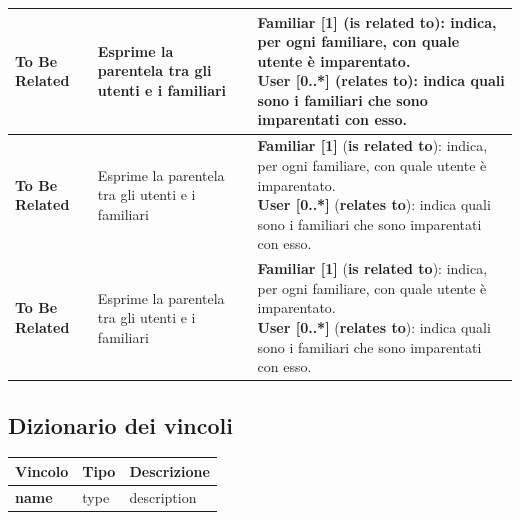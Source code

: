 \begin{longtable}{m{2.5cm}|m{4cm}|m{7.2cm}}
    \raggedright \textbf{To Be Related} & \raggedright Esprime la parentela tra gli utenti e i familiari &
    \parbox{7.2cm}{
        \textbf{Familiar [1]} (\textbf{is related to}): indica, per ogni familiare, con quale utente è imparentato. \\
        \textbf{User [0..*]} (\textbf{relates to}): indica quali sono i familiari che sono imparentati con esso.
    } \\ \hline

    \raggedright \textbf{To Be Related} & \raggedright Esprime la parentela tra gli utenti e i familiari &
    \parbox{7.2cm}{
        \textbf{Familiar [1]} (\textbf{is related to}): indica, per ogni familiare, con quale utente è imparentato. \\
        \textbf{User [0..*]} (\textbf{relates to}): indica quali sono i familiari che sono imparentati con esso.
    } \\ \hline

    \raggedright \textbf{To Be Related} & \raggedright Esprime la parentela tra gli utenti e i familiari &
    \parbox{7.2cm}{
        \textbf{Familiar [1]} (\textbf{is related to}): indica, per ogni familiare, con quale utente è imparentato. \\
        \textbf{User [0..*]} (\textbf{relates to}): indica quali sono i familiari che sono imparentati con esso.
    } \\ \hline

\end{longtable}

\subsection{Dizionario dei vincoli}

\begin{longtable}{m{2.5cm}|m{4cm}|m{7.2cm}}
    
    \rowcolor{black!10}
    \textbf{Vincolo} & \textbf{Tipo} & \textbf{Descrizione} \\ \hline
    \endhead

    \raggedright \textbf{name} & \raggedright type &
    description\\ \hline

\end{longtable}